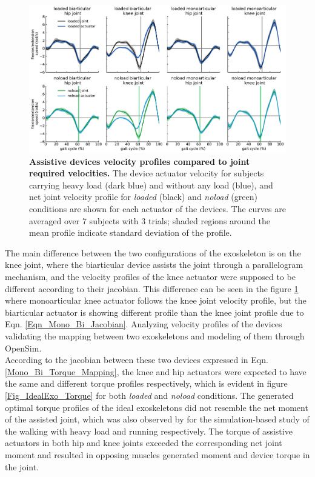 \documentclass[10pt,letterpaper]{article}
\begin{document}
\begin{figure}[ht]   
	\centering
	\includegraphics[width=\linewidth]{Ideal_Exo_MonovsBi_Figures/PaperFigure_Exoskeletons_Speed.pdf}
	\vspace{1mm}
	\caption{{\small\textbf{Assistive devices velocity profiles compared to joint required velocities.} The device actuator velocity for subjects carrying heavy load (dark blue) and without any load (blue), and net joint velocity profile for \textit{loaded} (black) and \textit{noload} (green) conditions are shown for each actuator of the devices. The curves are averaged over 7 subjects with 3 trials; shaded regions around the mean profile indicate standard deviation of the profile.}}
	\label{Fig_IdealExo_Speed}
\end{figure}
The main difference between the two configurations of the exoskeleton is on the knee joint, where the biarticular device assists the joint through a parallelogram mechanism, and the velocity profiles of the knee actuator were supposed to be different according to their jacobian. This difference can be seen in the figure \ref{Fig_IdealExo_Speed} where monoarticular knee actuator follows the knee joint velocity profile, but the biarticular actuator is showing different profile than the knee joint profile due to Eqn. \eqref{Eqn_Mono_Bi_Jacobian}. Analyzing velocity profiles of the devices validating the mapping between two exoskeletons and modeling of them through OpenSim.\\
According to the jacobian between these two devices expressed in Eqn. \ref{Mono_Bi_Torque_Mapping}, the knee and hip actuators were expected to have the same and different torque profiles respectively, which is evident in figure \ref{Fig_IdealExo_Torque} for both \textit{loaded} and \textit{noload} conditions. The generated optimal torque profiles of the ideal exoskeletons did not resemble the net moment of the assisted joint, which was also observed by \cite{93,2} for the simulation-based study of the walking with heavy load and running respectively. The torque of assistive actuators in both hip and knee joints exceeded the corresponding net joint moment and resulted in opposing muscles generated moment and device torque in the joint.\\
\end{document}

